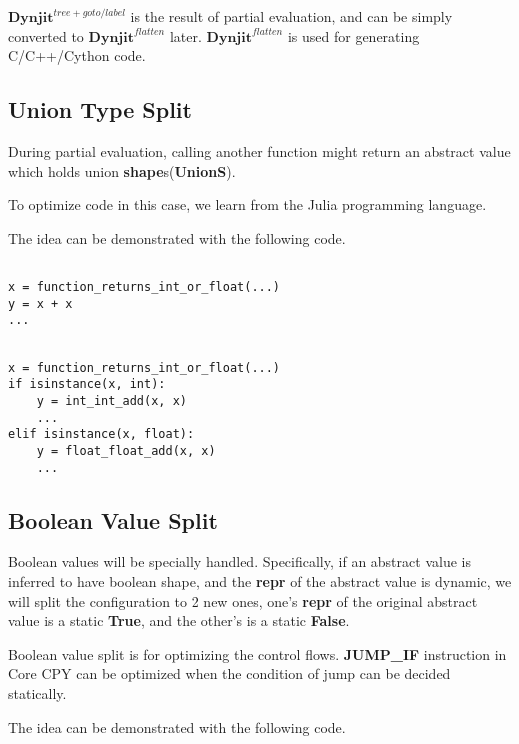 \documentclass[conference]{IEEEtran}
\begin{document}
$\mathbf{Dynjit}^{tree+goto/label}$ is the result of partial evaluation,
and can be simply converted to $\mathbf{Dynjit}^{flatten}$ later.
$\mathbf{Dynjit}^{flatten}$ is used for generating C/C++/Cython code.


\subsection{Union Type Split}

During partial evaluation, calling another function might return an abstract value which holds
union \textbf{shape}s(\textbf{UnionS}).

To optimize code in this case, we learn from the Julia programming language.

The idea can be demonstrated with the following code.

\lstset{language=Python, showlines=true, mathescape=true}
\begin{lstlisting}[caption=Union Split: Original Python Code]

x = function_returns_int_or_float(...)
y = x + x
...
\end{lstlisting}

\newpage


\lstset{language=Python, showlines=true, mathescape=true}
\begin{lstlisting}[caption=Union Split: Union-split Code]

x = function_returns_int_or_float(...)
if isinstance(x, int):
    y = int_int_add(x, x)
    ...
elif isinstance(x, float):
    y = float_float_add(x, x)
    ...
\end{lstlisting}



\subsection{Boolean Value Split}

Boolean values will be specially handled. Specifically,
if an abstract value is inferred to have boolean shape,
and the \textbf{repr} of the abstract value is dynamic,
we will split the configuration to 2 new ones,
one's \textbf{repr} of the original abstract value is a static \textbf{True},
and the other's is a static \textbf{False}.

Boolean value split is for optimizing the control flows.
\textbf{JUMP\_IF} instruction in Core CPY can be optimized
when the condition of jump can be decided statically.

The idea can be demonstrated with the following code.
\end{document}
